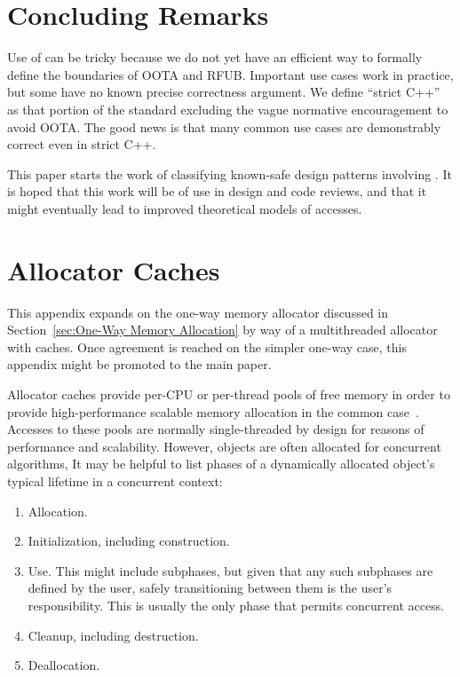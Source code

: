 \documentclass[10]{article}
\begin{document}
\section{Concluding Remarks}
\label{sec:Concluding Remarks}

Use of  can be tricky because we do not yet
have an efficient way to formally define the boundaries of OOTA and
RFUB.
Important  use cases work in practice, but
some have no known precise correctness argument.
We define ``strict C++'' as that portion of the standard excluding
the vague normative encouragement to avoid OOTA.
The good news is that many common  use cases
are demonstrably correct even in strict C++.

This paper starts the work of classifying known-safe design patterns
involving .
It is hoped that this work will be of use in design and code reviews,
and that it might eventually lead to improved theoretical models of
 accesses.

\clearpage
\appendix

\section{Allocator Caches}
\label{sec:Allocator Caches}

This appendix expands on the one-way memory allocator discussed in
Section~\ref{sec:One-Way Memory Allocation}
by way of a multithreaded allocator with caches.
Once agreement is reached on the simpler one-way case, this appendix
might be promoted to the main paper.

Allocator caches provide per-CPU or per-thread pools of free memory
in order to provide high-performance scalable memory allocation in
the common case~\cite{McKenney93,Bonwick94slab}.
Accesses to these pools are normally single-threaded by design for
reasons of performance and scalability.
However, objects are often allocated for concurrent algorithms,
It may be helpful to list phases of a dynamically allocated object's
typical lifetime in a concurrent context:

\begin{enumerate}
\item	Allocation.
\item	Initialization, including construction.
\item	Use.
	This might include subphases, but given that any such
	subphases are defined by the user, safely transitioning between
	them is the user's responsibility.
	This is usually the only phase that permits concurrent access.
\item	Cleanup, including destruction.
\item	Deallocation.
\end{enumerate}
\end{document}
